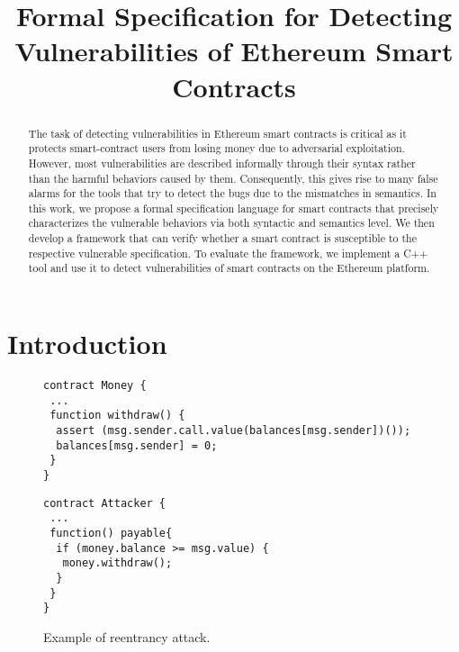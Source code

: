 \documentclass[runningheads]{llncs}
\begin{document}
%
\title{Formal Specification for Detecting Vulnerabilities of Ethereum Smart Contracts}
%
%
\author{}
%
\authorrunning{}
%
%
\maketitle              %
%
\begin{abstract}
The task of detecting vulnerabilities in Ethereum smart contracts is critical as it protects smart-contract users from losing money due to adversarial exploitation. However, most vulnerabilities are described informally through their syntax rather than the harmful behaviors caused by them. Consequently, this gives rise to many false alarms for the tools that try to detect the bugs due to the mismatches in semantics. In this work, we propose a formal specification language for smart contracts that
 precisely characterizes the vulnerable behaviors via both syntactic and semantics level. We then develop a framework that can verify whether a smart contract is susceptible to the respective vulnerable specification. To evaluate the framework, we implement a C++ tool and use it to detect vulnerabilities of smart contracts on the Ethereum platform.
\end{abstract}

\section{Introduction}

\begin{figure}
\begin{lstlisting}[language=Solidity]
contract Money {
 ...
 function withdraw() {
  assert (msg.sender.call.value(balances[msg.sender])());
  balances[msg.sender] = 0;
 }
}
\end{lstlisting}

\begin{lstlisting}[language=Solidity]
contract Attacker {
 ...
 function() payable{
  if (money.balance >= msg.value) {
   money.withdraw();
  }
 }
}
\end{lstlisting}
\caption{Example of reentrancy attack.}\label{fig:ex1}
\end{figure}
\end{document}
